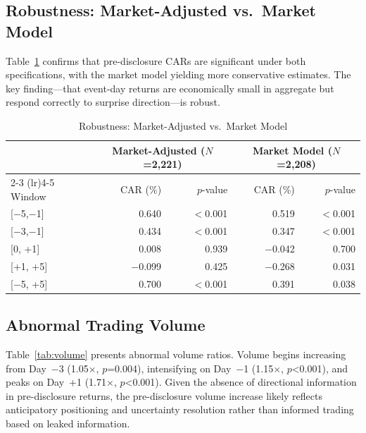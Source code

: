 \documentclass[review,authoryear]{elsarticle}
\begin{document}
\subsection{Robustness: Market-Adjusted vs.\ Market Model}

Table~\ref{tab:robustness} confirms that pre-disclosure CARs are significant under both specifications, with the market model yielding more conservative estimates. The key finding---that event-day returns are economically small in aggregate but respond correctly to surprise direction---is robust.

\begin{table}[H]
\centering
\caption{Robustness: Market-Adjusted vs.\ Market Model}
\label{tab:robustness}
\begin{tabular}{lrrrr}
\toprule
& \multicolumn{2}{c}{Market-Adjusted ($N$=2,221)} & \multicolumn{2}{c}{Market Model ($N$=2,208)} \\
\cmidrule(lr){2-3} \cmidrule(lr){4-5}
Window & CAR (\%) & $p$-value & CAR (\%) & $p$-value \\
\midrule
{[}$-$5,$-$1{]} & 0.640 & $<$0.001 & 0.519 & $<$0.001 \\
{[}$-$3,$-$1{]} & 0.434 & $<$0.001 & 0.347 & $<$0.001 \\
{[}0, +1{]} & 0.008 & 0.939 & $-$0.042 & 0.700 \\
{[}+1, +5{]} & $-$0.099 & 0.425 & $-$0.268 & 0.031 \\
{[}$-$5, +5{]} & 0.700 & $<$0.001 & 0.391 & 0.038 \\
\bottomrule
\end{tabular}
\end{table}

\subsection{Abnormal Trading Volume}

Table~\ref{tab:volume} presents abnormal volume ratios. Volume begins increasing from Day~$-$3 (1.05$\times$, $p$=0.004), intensifying on Day~$-$1 (1.15$\times$, $p$<0.001), and peaks on Day~+1 (1.71$\times$, $p$<0.001). Given the absence of directional information in pre-disclosure returns, the pre-disclosure volume increase likely reflects anticipatory positioning and uncertainty resolution rather than informed trading based on leaked information.
\end{document}
